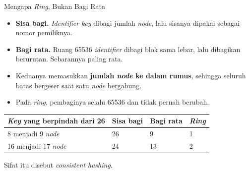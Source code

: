 \documentclass[aspectratio=169, table, 12pt]{beamer}
\begin{document}
\begin{frame}{{\Large Mengapa \textit{Ring}, Bukan Bagi Rata}}
  \vspace{4pt}
  \begin{itemize}\small
    \item \textbf{Sisa bagi.} \textit{Identifier} \textit{key} dibagi jumlah \textit{node}, lalu
          sisanya dipakai sebagai nomor pemiliknya.
    \item \textbf{Bagi rata.} Ruang 65536 \textit{identifier} dibagi blok sama lebar, lalu
          dibagikan berurutan. Sebarannya paling rata.
    \item Keduanya memasukkan \textbf{jumlah \textit{node} ke dalam rumus},
          sehingga seluruh batas bergeser saat satu \textit{node} bergabung.
    \item Pada \textit{ring}, pembaginya selalu 65536 dan tidak pernah berubah.
  \end{itemize}

  \vspace{6pt}
  \centering
  \small
  \begin{tabularx}{0.95\textwidth}{|X|l|l|l|}
    \hline
    \textbf{\textit{Key} yang berpindah dari 26} & \textbf{Sisa bagi} & \textbf{Bagi rata} & \textbf{\textit{Ring}} \\
    \hline
    8 menjadi 9 \textit{node} & 26 & 9 & 1 \\
    \hline
    16 menjadi 17 \textit{node} & 24 & 13 & 2 \\
    \hline
  \end{tabularx}

  \vspace{4pt}
  {\footnotesize Sifat itu disebut \textit{consistent hashing}.}
\end{frame}
\end{document}
